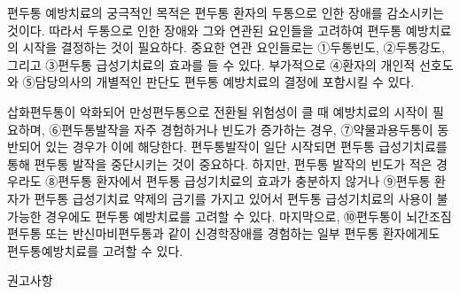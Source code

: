 \documentclass[]{book}
\begin{document}
편두통 예방치료의 궁극적인 목적은 편두통 환자의 두통으로 인한 장애를 감소시키는 것이다. 따라서 두통으로 인한 장애와 그와 연관된 요인들을 고려하여 편두통 예방치료의 시작을 결정하는 것이 필요하다. 중요한 연관 요인들로는 ①두통빈도, ②두통강도, 그리고 ③편두통 급성기치료의 효과를 들 수 있다. 부가적으로 ④환자의 개인적 선호도와 ⑤담당의사의 개별적인 판단도 편두통 예방치료의 결정에 포함시킬 수 있다.

삽화편두통이 악화되어 만성편두통으로 전환될 위험성이 클 때 예방치료의 시작이 필요하며, ⑥편두통발작을 자주 경험하거나 빈도가 증가하는 경우, ⑦약물과용두통이 동반되어 있는 경우가 이에 해당한다. 편두통발작이 일단 시작되면 편두통 급성기치료를 통해 편두통 발작을 중단시키는 것이 중요하다. 하지만, 편두통 발작의 빈도가 적은 경우라도 ⑧편두통 환자에서 편두통 급성기치료의 효과가 충분하지 않거나 ⑨편두통 환자가 편두통 급성기치료 약제의 금기를 가지고 있어서 편두통 급성기치료의 사용이 불가능한 경우에도 편두통 예방치료를 고려할 수 있다. 마지막으로, ⑩편두통이 뇌간조짐편두통 또는 반신마비편두통과 같이 신경학장애를 경험하는 일부 편두통 환자에게도 편두통예방치료를 고려할 수 있다.

권고사항
\end{document}
